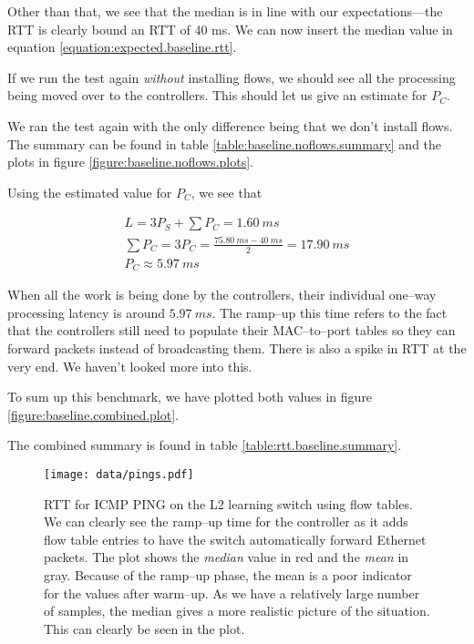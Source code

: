 Other than that, we see that the median is in line with our
expectations---the RTT is clearly bound an RTT of 40 ms.  We can now insert
the median value in equation \ref{equation:expected.baseline.rtt}.



If we run the test again \textit{without} installing flows, we should see
all the processing being moved over to the controllers.  This should let us
give an estimate for $P_C$.

We ran the test again  with the only difference being that we don't
install flows.  The summary can be found in table
\ref{table:baseline.noflows.summary} and the plots in figure
\ref{figure:baseline.noflows.plots}.

Using the estimated value for $P_C$, we see that

\begin{gather*}
  L = 3P_S + \sum P_C = 1.60~ms \\
  \sum P_C = 3P_C = \frac{75.80~ms - 40~ms}{2} = 17.90~ms \\
  P_C \approx 5.97~ms
\end{gather*}

When all the work is being done by the controllers, their individual
one--way processing latency is around $5.97~ms$.  The ramp--up this time
refers to the fact that the controllers still need to populate their
MAC--to--port tables so they can forward packets instead of broadcasting
them.  There is also a spike in RTT at the very end.  We haven't looked more
into this.




To sum up this benchmark, we have plotted both values in figure
\ref{figure:baseline.combined.plot}.

The combined summary is found in table \ref{table:rtt.baseline.summary}.



\begin{figure}[H]
  \centering
  \texttt{[image: data/pings.pdf]}
  \caption{\acs{RTT} for ICMP PING on the L2 learning switch using flow tables.
           We can clearly see the ramp--up time for the controller as it
           adds flow table entries to have the switch automatically forward
           Ethernet packets. The plot shows the \textit{median} value in red
  and the \textit{mean} in gray.  Because of the ramp--up phase, the mean is a poor
  indicator for the values after warm--up.  As we have a relatively large
  number of samples, the median gives a more realistic picture of the
  situation.  This can clearly be seen in the plot.}
  \label{benchmark:l2.learning.switch.ping}
\end{figure}

